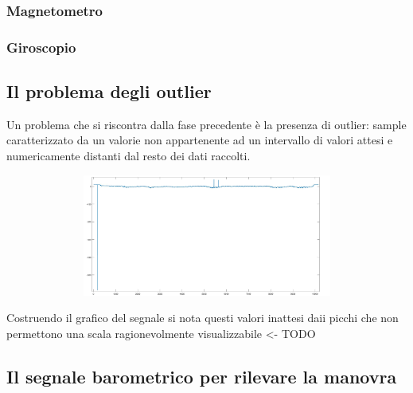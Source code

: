 \documentclass[a4paper]{article}
\begin{document}
\subsubsection{Magnetometro}

\subsubsection{Giroscopio}

\subsection{Il problema degli outlier}
Un problema che si riscontra dalla fase precedente è la presenza di outlier: sample caratterizzato da un valorie non appartenente ad un intervallo di valori attesi e numericamente distanti dal resto dei dati raccolti. \\

\begin{minipage}{\linewidth}
\begin{center}
\includegraphics[width=154mm, height= 40mm]{./images/registrazione_tesi/outliers.jpg} 
\end{center}
\end{minipage}
\makebox[\linewidth]{}

Costruendo il grafico del segnale si nota questi valori inattesi daii picchi che non permettono una scala ragionevolmente visualizzabile <- TODO

\subsection{Il segnale barometrico per rilevare la manovra}
\end{document}

